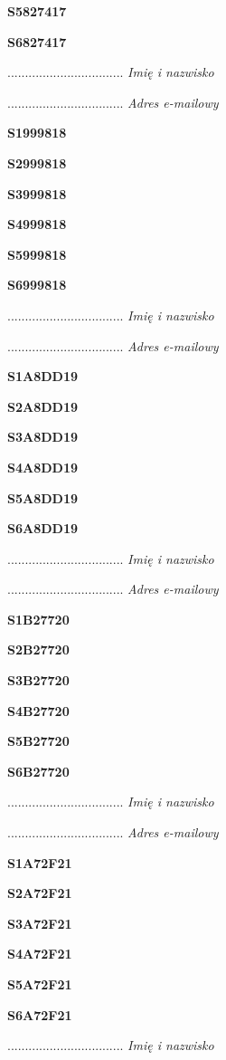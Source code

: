 \Large \textbf{S5827417}

\Large \textbf{S6827417}

.................................
\textit{Imię i nazwisko}

.................................
\textit{Adres e-mailowy}

\Large \textbf{S1999818}

\Large \textbf{S2999818}

\Large \textbf{S3999818}

\Large \textbf{S4999818}

\Large \textbf{S5999818}

\Large \textbf{S6999818}

.................................
\textit{Imię i nazwisko}

.................................
\textit{Adres e-mailowy}

\Large \textbf{S1A8DD19}

\Large \textbf{S2A8DD19}

\Large \textbf{S3A8DD19}

\Large \textbf{S4A8DD19}

\Large \textbf{S5A8DD19}

\Large \textbf{S6A8DD19}

.................................
\textit{Imię i nazwisko}

.................................
\textit{Adres e-mailowy}

\Large \textbf{S1B27720}

\Large \textbf{S2B27720}

\Large \textbf{S3B27720}

\Large \textbf{S4B27720}

\Large \textbf{S5B27720}

\Large \textbf{S6B27720}

.................................
\textit{Imię i nazwisko}

.................................
\textit{Adres e-mailowy}

\Large \textbf{S1A72F21}

\Large \textbf{S2A72F21}

\Large \textbf{S3A72F21}

\Large \textbf{S4A72F21}

\Large \textbf{S5A72F21}

\Large \textbf{S6A72F21}

.................................
\textit{Imię i nazwisko}

